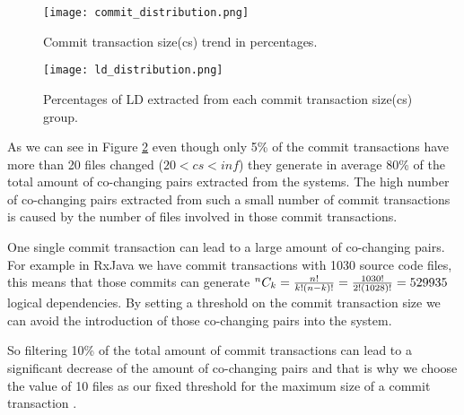 \begin{figure}[!h]
\centering
\texttt{[image: commit\_distribution.png]}
\caption{Commit transaction size(cs) trend in percentages.}
\label{fig:fig_cs}
\centering
\end{figure}


\begin{figure}[!h]
\centering
\texttt{[image: ld\_distribution.png]}
\caption{Percentages of LD extracted from each commit transaction size(cs) group.}
\label{fig:fig_ld_cs}
\centering
\end{figure}

As we can see in Figure \ref{fig:fig_ld_cs} even though only 5\% of the commit transactions have more than 20 files changed ($20<cs<inf$) they generate in average 80\% of the total amount of co-changing pairs extracted from the systems.
The high number of co-changing pairs extracted from such a small number of commit transactions is caused by the number of files involved in those commit transactions. 

One single commit transaction can lead to a large amount of co-changing pairs. For example in RxJava we have commit transactions with 1030 source code files, this means that those commits can generate 
${}^{n}C_{k}=\frac{n!}{k!(n-k)!} = \frac{1030!}{2!(1028)!} = 529 935$ logical dependencies. By setting a threshold on the commit transaction size we can avoid the introduction of those co-changing pairs into the system.



So filtering 10\% of the total amount of commit transactions can lead to a significant decrease of the amount of co-changing pairs and that is why we choose the value of 10 files as our fixed threshold for the maximum size of a commit transaction \cite{DepSACI}.



